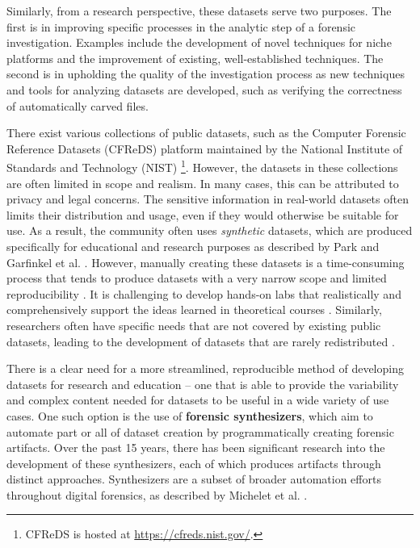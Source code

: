 \documentclass[final,5p,times,twocolumn]{elsarticle}
\begin{document}
Similarly, from a research perspective, these datasets serve two
purposes. The first is in improving specific processes in the analytic
step of a forensic investigation. Examples include the development of
novel techniques for niche platforms and the improvement of existing,
well-established techniques. The second is in upholding the quality of
the investigation process as new techniques and tools for analyzing
datasets are developed, such as verifying the correctness of
automatically carved files.

There exist various collections of public datasets, such as the Computer
Forensic Reference Datasets (CFReDS) platform maintained by the National
Institute of Standards and Technology (NIST) \footnote{CFReDS is hosted
  at \url{https://cfreds.nist.gov/}.}. However, the datasets in these
collections are often limited in scope and realism. In many cases, this
can be attributed to privacy and legal concerns. The sensitive
information in real-world datasets often limits their distribution and
usage, even if they would otherwise be suitable for use. As a result,
the community often uses \emph{synthetic} datasets, which are produced
specifically for educational and research purposes as described by Park
and Garfinkel et al.
\citep{parkTREDEVMPOPCultivating2018,garfinkelBringingScienceDigital2009}.
However, manually creating these datasets is a time-consuming process
that tends to produce datasets with a very narrow scope and limited
reproducibility
\citep{garfinkelBringingScienceDigital2009,grajedaAvailabilityDatasetsDigital2017}.
It is challenging to develop hands-on labs that realistically and
comprehensively support the ideas learned in theoretical courses
\citep{adelsteinAutomaticallyCreatingRealistic2005,guptaDigitalForensicsLab2022,lawrenceFrameworkDesignWebbased2009}.
Similarly, researchers often have specific needs that are not covered by
existing public datasets, leading to the development of datasets that
are rarely redistributed
\citep{grajedaAvailabilityDatasetsDigital2017}.

There is a clear need for a more streamlined, reproducible method of
developing datasets for research and education -- one that is able to
provide the variability and complex content needed for datasets to be
useful in a wide variety of use cases. One such option is the use of
\textbf{forensic synthesizers}, which aim to automate part or all of
dataset creation by programmatically creating forensic artifacts. Over
the past 15 years, there has been significant research into the
development of these synthesizers, each of which produces artifacts
through distinct approaches. Synthesizers are a subset of broader
automation efforts throughout digital forensics, as described by
Michelet et al. \citep{micheletAutomationDigitalForensics2023}.
\end{document}
